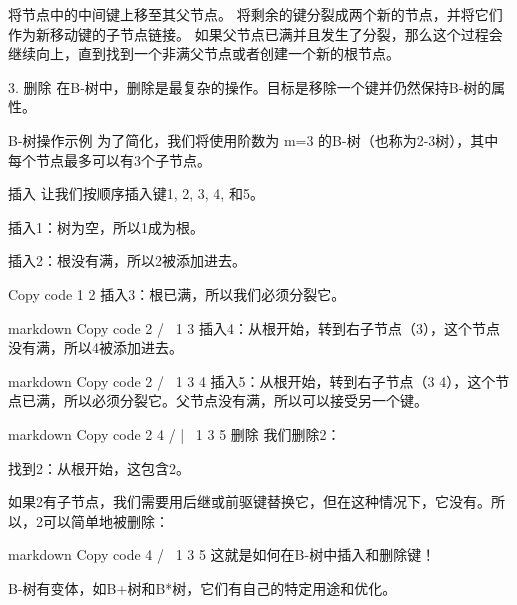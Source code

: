 将节点中的中间键上移至其父节点。
将剩余的键分裂成两个新的节点，并将它们作为新移动键的子节点链接。
如果父节点已满并且发生了分裂，那么这个过程会继续向上，直到找到一个非满父节点或者创建一个新的根节点。

3. 删除
在B-树中，删除是最复杂的操作。目标是移除一个键并仍然保持B-树的属性。

B-树操作示例
为了简化，我们将使用阶数为 m=3 的B-树（也称为2-3树），其中每个节点最多可以有3个子节点。

插入
让我们按顺序插入键1, 2, 3, 4, 和5。

插入1：树为空，所以1成为根。

插入2：根没有满，所以2被添加进去。

Copy code
 1 2
插入3：根已满，所以我们必须分裂它。

markdown
Copy code
     2
   /   \
 1       3
插入4：从根开始，转到右子节点（3），这个节点没有满，所以4被添加进去。

markdown
Copy code
     2
   /   \
 1      3 4
插入5：从根开始，转到右子节点（3 4），这个节点已满，所以必须分裂它。父节点没有满，所以可以接受另一个键。

markdown
Copy code
     2 4
   /   |   \
 1      3    5
删除
我们删除2：

找到2：从根开始，这包含2。

如果2有子节点，我们需要用后继或前驱键替换它，但在这种情况下，它没有。所以，2可以简单地被删除：

markdown
Copy code
     4
   /   \
 1      3 5
这就是如何在B-树中插入和删除键！


B-树有变体，如B+树和B*树，它们有自己的特定用途和优化。